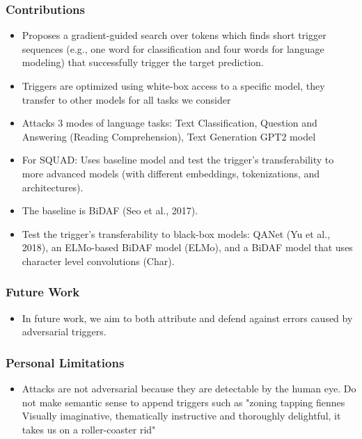 \documentclass{article}
\begin{document}
\begin{flushleft}
\subsubsection*{Contributions}
\begin{itemize}
  \item Proposes a gradient-guided search over tokens which finds short trigger sequences (e.g., one word for classification and four words for language modeling) that successfully trigger the target prediction. 
  \item Triggers are optimized using white-box access to a specific model, they transfer to other models for all tasks we consider
  \item Attacks 3 modes of language tasks: Text Classification, Question and Answering (Reading Comprehension), Text Generation GPT2 model 
  \item For SQUAD:  Uses baseline model and test the trigger’s transferability to more advanced models (with different embeddings, tokenizations, and architectures). 
  \item The baseline is BiDAF (Seo et al., 2017). 
  \item Test the trigger’s transferability to black-box models: QANet (Yu et al., 2018), an ELMo-based BiDAF model (ELMo), and a BiDAF model that uses character level convolutions (Char).
\end{itemize}

\subsubsection*{Future Work}
\begin{itemize}
  \item In future work, we aim to both attribute and defend
against errors caused by adversarial triggers.
\end{itemize}

\subsubsection*{Personal Limitations}
\begin{itemize}
    \item Attacks are not adversarial because they are detectable by the human eye. Do not make semantic sense to append triggers such as "zoning tapping fiennes Visually imaginative, thematically instructive and thoroughly delightful, it takes us on a roller-coaster rid"
\end{itemize}


\end{flushleft}
\end{document}
